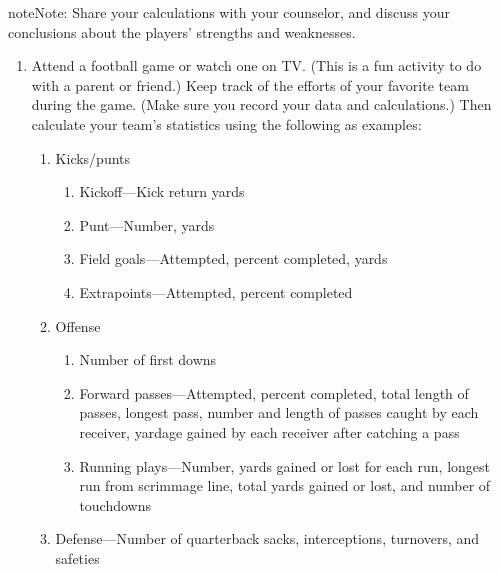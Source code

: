 \documentclass[letterpaper,10pt,english]{sphinxmanual}
\begin{document}
\begin{sphinxadmonition}{note}{Note:}
Share your calculations with your counselor, and discuss your conclusions about the players’ strengths and weaknesses.
\end{sphinxadmonition}
\begin{enumerate}
%
\setcounter{enumi}{3}
\item {} 
Attend a football game or watch one on TV. (This is a fun activity to do with a parent or friend.) Keep track of the efforts of your favorite team during the game. (Make sure you record your data and calculations.) Then calculate your team’s statistics using the following as examples:
\begin{enumerate}
%
\item {} 
Kicks/punts
\begin{enumerate}
%
\item {} 
Kickoff—Kick return yards

\item {} 
Punt—Number, yards

\item {} 
Field goals—Attempted, percent completed, yards

\item {} 
Extrapoints—Attempted, percent completed

\end{enumerate}

\item {} 
Offense
\begin{enumerate}
%
\item {} 
Number of first downs

\item {} 
Forward passes—Attempted, percent completed, total length of passes, longest pass, number and length of passes caught by each receiver, yardage gained by each receiver after catching a pass

\item {} 
Running plays—Number, yards gained or lost for each run, longest run from scrimmage line, total yards gained or lost, and number of touchdowns

\end{enumerate}

\item {} 
Defense—Number of quarterback sacks, interceptions, turnovers, and safeties

\end{enumerate}

\end{enumerate}
\end{document}
